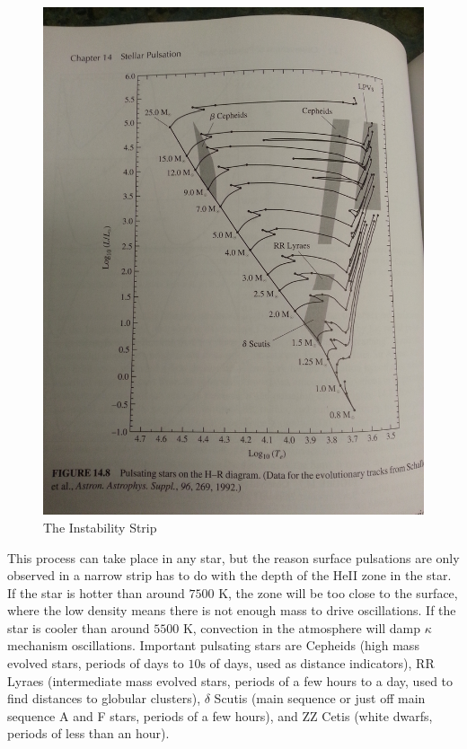 \begin{figure}[ht]
\centering
\includegraphics[width=\textwidth, angle=270]{strip.jpg}
\caption{The Instability Strip \label{fig:strip}}
\end{figure}


This process can take place in any star, but the reason surface pulsations 
are only observed in a narrow strip has to do with the depth of the HeII 
zone in the star.  If the star is hotter than around $7500$ K, the zone 
will be too close to the surface, where the low density means there is not 
enough mass to drive oscillations.  If the star is cooler than around $5500$ K, 
convection in the atmosphere will damp $\kappa$ mechanism oscillations.  
Important pulsating stars are Cepheids (high mass evolved stars, periods 
of days to $10$s of days, used as distance indicators), RR Lyraes (intermediate 
mass evolved stars, periods of a few hours to a day, used to find distances 
to globular clusters), $\delta$ Scutis (main sequence or just off main sequence 
A and F stars, periods of a few hours), and ZZ Cetis (white dwarfs, periods 
of less than an hour). 

